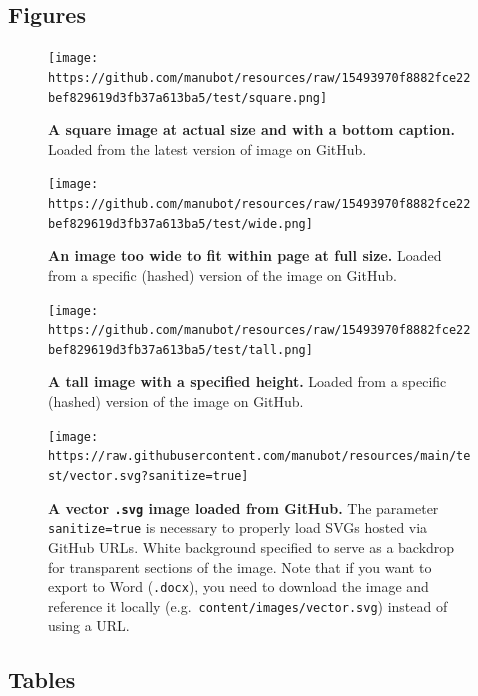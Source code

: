 \hypertarget{figures}{%
\subsection{Figures}\label{figures}}

\begin{figure}
\hypertarget{fig:square-image}{%
\centering
\texttt{[image: https://github.com/manubot/resources/raw/15493970f8882fce22bef829619d3fb37a613ba5/test/square.png]}
\caption{\textbf{A square image at actual size and with a bottom caption.}
Loaded from the latest version of image on GitHub.}\label{fig:square-image}
}
\end{figure}

\begin{figure}
\hypertarget{fig:wide-image}{%
\centering
\texttt{[image: https://github.com/manubot/resources/raw/15493970f8882fce22bef829619d3fb37a613ba5/test/wide.png]}
\caption{\textbf{An image too wide to fit within page at full size.}
Loaded from a specific (hashed) version of the image on GitHub.}\label{fig:wide-image}
}
\end{figure}

\begin{figure}
\hypertarget{fig:tall-image}{%
\centering
\texttt{[image: https://github.com/manubot/resources/raw/15493970f8882fce22bef829619d3fb37a613ba5/test/tall.png]}
\caption{\textbf{A tall image with a specified height.}
Loaded from a specific (hashed) version of the image on GitHub.}\label{fig:tall-image}
}
\end{figure}

\begin{figure}
\hypertarget{fig:vector-image}{%
\centering
\texttt{[image: https://raw.githubusercontent.com/manubot/resources/main/test/vector.svg?sanitize=true]}
\caption{\textbf{A vector \texttt{.svg} image loaded from GitHub.}
The parameter \texttt{sanitize=true} is necessary to properly load SVGs hosted via GitHub URLs.
White background specified to serve as a backdrop for transparent sections of the image.
Note that if you want to export to Word (\texttt{.docx}), you need to download the image and reference it locally (e.g.~\texttt{content/images/vector.svg}) instead of using a URL.}\label{fig:vector-image}
}
\end{figure}

\hypertarget{tables}{%
\subsection{Tables}\label{tables}}


